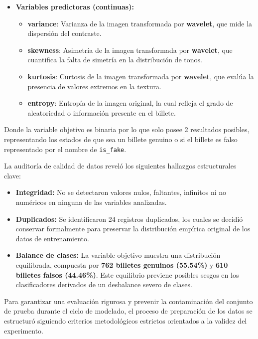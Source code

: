 \documentclass[conference]{IEEEtran}
\begin{document}
	\begin{itemize}
		\item \textbf{Variables predictoras (continuas):}
		\begin{itemize}
			\item \textbf{variance}: Varianza de la imagen transformada por \textbf{wavelet}, que mide la dispersión del contraste.
			\item \textbf{skewness}: Asimetría de la imagen transformada por \textbf{wavelet}, que cuantifica la falta de simetría en la distribución de tonos.
			\item \textbf{kurtosis}: Curtosis de la imagen transformada por \textbf{wavelet}, que evalúa la presencia de valores extremos en la textura.
			\item \textbf{entropy}: Entropía de la imagen original, la cual refleja el grado de aleatoriedad o información presente en el billete.
		\end{itemize}
		
	\end{itemize}
	
	
	Donde la variable objetivo es binaria por lo que solo posee 2 resultados posibles, representando los estados de que sea un billete genuino o si el billete es falso representado por el nombre de \texttt{is\_fake}.
	
	La auditoría de calidad de datos reveló los siguientes hallazgos estructurales clave:
	
	\begin{itemize}
		\item \textbf{Integridad:} No se detectaron valores nulos, faltantes, infinitos ni no numéricos en ninguna de las variables analizadas.
		\item \textbf{Duplicados:} Se identificaron 24 registros duplicados, los cuales se decidió conservar formalmente para preservar la distribución empírica original de los datos de entrenamiento.
		\item \textbf{Balance de clases:} La variable objetivo muestra una distribución equilibrada, compuesta por \textbf{762 billetes genuinos (55.54\%)} y \textbf{610 billetes falsos (44.46\%)}. Este equilibrio previene posibles sesgos en los clasificadores derivados de un desbalance severo de clases.
	\end{itemize}
	
	Para garantizar una evaluación rigurosa y prevenir la contaminación del conjunto de prueba durante el ciclo de modelado, el proceso de preparación de los datos se estructuró siguiendo criterios metodológicos estrictos orientados a la validez del experimento.
	
\end{document}
